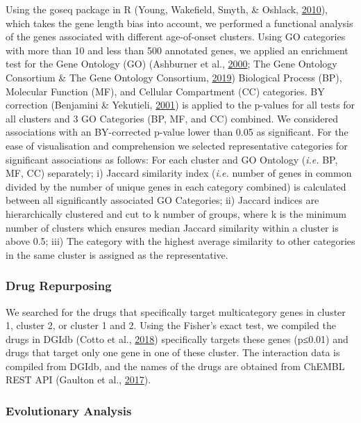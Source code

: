\documentclass[12pt,twoside]{unicam}
\begin{document}
Using the goseq package in R (Young, Wakefield, Smyth, \& Oshlack, \protect\hyperlink{ref-Young2010}{2010}), which takes the gene length bias into account, we performed a functional analysis of the genes associated with different age-of-onset clusters. Using GO categories with more than 10 and less than 500 annotated genes, we applied an enrichment test for the Gene Ontology (GO) (Ashburner et al., \protect\hyperlink{ref-Ashburner2000}{2000}; The Gene Ontology Consortium \& The Gene Ontology Consortium, \protect\hyperlink{ref-The_Gene_Ontology_Consortium2019}{2019}) Biological Process (BP), Molecular Function (MF), and Cellular Compartment (CC) categories. BY correction (Benjamini \& Yekutieli, \protect\hyperlink{ref-Benjamini2001}{2001}) is applied to the p-values for all tests for all clusters and 3 GO Categories (BP, MF, and CC) combined. We considered associations with an BY-corrected p-value lower than 0.05 as significant. For the ease of visualisation and comprehension we selected representative categories for significant associations as follows: For each cluster and GO Ontology (\emph{i.e.} BP, MF, CC) separately; i) Jaccard similarity index (\emph{i.e.} number of genes in common divided by the number of unique genes in each category combined) is calculated between all significantly associated GO Categories; ii) Jaccard indices are hierarchically clustered and cut to k number of groups, where k is the minimum number of clusters which ensures median Jaccard similarity within a cluster is above 0.5; iii) The category with the highest average similarity to other categories in the same cluster is assigned as the representative.

\hypertarget{drug-repurposing}{%
\subsubsection{Drug Repurposing}\label{drug-repurposing}}

We searched for the drugs that specifically target multicategory genes in cluster 1, cluster 2, or cluster 1 and 2. Using the Fisher's exact test, we compiled the drugs in DGIdb (Cotto et al., \protect\hyperlink{ref-Cotto2018}{2018}) specifically targets these genes (p≤0.01) and drugs that target only one gene in one of these cluster. The interaction data is compiled from DGIdb, and the names of the drugs are obtained from ChEMBL REST API (Gaulton et al., \protect\hyperlink{ref-Gaulton2017}{2017}).

\hypertarget{evolutionary-analysis}{%
\subsubsection{Evolutionary Analysis}\label{evolutionary-analysis}}
\end{document}
